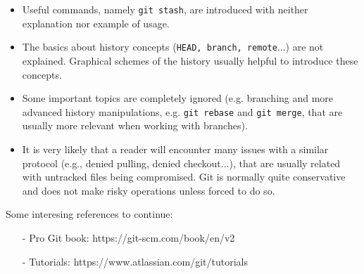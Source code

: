\documentclass[a4paper,10pt]{article}
\begin{document}
\begin{itemize}
 \item Useful commands, namely \texttt{git stash}, are introduced with neither explanation nor example of usage.
 \item The basics about history concepts (\texttt{HEAD, branch, remote}...) are not explained. Graphical schemes of the history usually helpful to introduce these concepts.
 \item Some important topics are completely ignored (e.g. branching and more advanced history manipulations, e.g. \texttt{git rebase} and \texttt{git merge}, that are usually more  relevant when working with branches).
 \item It is very likely that a reader will encounter many issues with a similar protocol (e.g., denied pulling, denied checkout...), that are usually related with untracked files being compromised. Git is normally quite conservative and does not make risky operations unless forced to do so.
\end{itemize}
\vspace*{0.5cm}

Some interesing references to continue:
\begin{itemize}
 \item[-] Pro Git book: https://git-scm.com/book/en/v2
 \item[-] Tutorials: https://www.atlassian.com/git/tutorials
\end{itemize}
\end{document}
